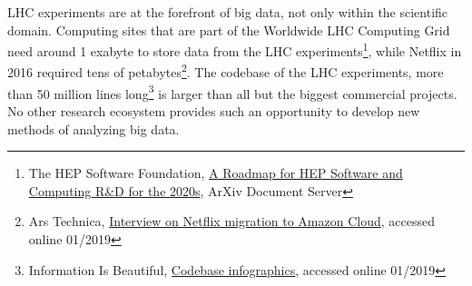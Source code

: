 
LHC experiments are at the forefront of big data, not only within the scientific domain.
Computing sites that are part of the Worldwide LHC Computing Grid need around 1 exabyte to store data from the LHC experiments\footnote{The HEP Software Foundation, \href{https://arxiv.org/pdf/1712.06982.pdf}{A Roadmap for HEP Software and Computing R\&D for the 2020s}, ArXiv Document Server}, while Netflix in 2016 required tens of petabytes\footnote{Ars Technica, \href{https://arstechnica.com/information-technology/2016/02/netflix-finishes-its-massive-migration-to-the-amazon-cloud/}{Interview on Netflix migration to Amazon Cloud}, accessed online 01/2019}. 
The codebase of the LHC experiments, more than 50 million lines long\footnote{Information Is Beautiful, \href{http://www.informationisbeautiful.net/visualizations/million-lines-of-code/}{Codebase infographics}, accessed online 01/2019} is larger than all but the biggest commercial projects.  
No other research ecosystem provides such an opportunity to develop new methods of analyzing big data. 

